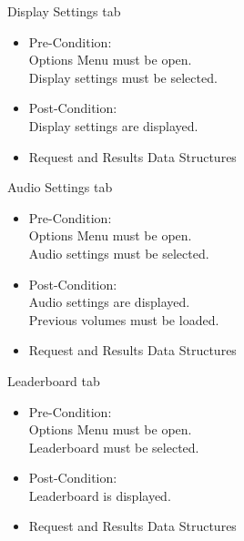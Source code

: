 \documentclass[letterpaper]{article}
\begin{document}
				\vspace{0.1in}Display Settings tab
					\begin{itemize}
						\item Pre-Condition: \\
							Options Menu must be open. \\
							Display settings must be selected. \\
						\item Post-Condition: \\
							Display settings are displayed. \\
						\item Request and Results Data Structures \\
						
					\end{itemize}
									
				\vspace{0.1in}Audio Settings tab
					\begin{itemize}
						\item Pre-Condition: \\
							Options Menu must be open. \\
							Audio settings must be selected. \\
						\item Post-Condition: \\
							Audio settings are displayed. \\
							Previous volumes must be loaded. \\
						\item Request and Results Data Structures \\
						
					\end{itemize}
									
				\vspace{0.1in}Leaderboard tab
					\begin{itemize}
						\item Pre-Condition: \\
							Options Menu must be open. \\
							Leaderboard must be selected. \\
						\item Post-Condition: \\
							Leaderboard is displayed. \\
						\item Request and Results Data Structures \\
						
					\end{itemize}									
									
\end{document}

